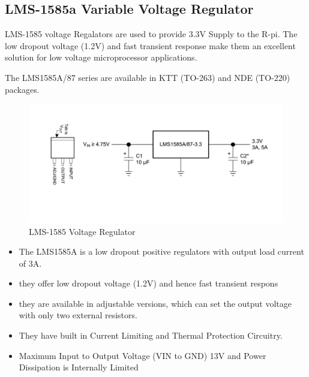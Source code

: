 \documentclass[11pt,a4paper]{article}
\begin{document}
	\subsection{LMS-1585a Variable Voltage Regulator} 
	LMS-1585 voltage Regalators are used to provide 3.3V Supply to the R-pi. The low dropout voltage (1.2V) and
	fast transient response make them an excellent solution for low voltage microprocessor applications.
	
	 The LMS1585A/87 series are available in KTT (TO-263) and NDE (TO-220) packages.
	 \begin{figure}[h!]
	 	\includegraphics[scale=0.49]{1585.jpg}
	 				\caption{LMS-1585 Voltage Regulator}
	 \end{figure}
	
	\begin{itemize}
		\item The LMS1585A is a low dropout positive regulators with output load current of 3A.
		\item they offer low dropout voltage (1.2V) and hence fast transient respons
		\item they are available in adjustable versions, which can set the output voltage with only two external resistors.
		\item They have built in Current Limiting and Thermal Protection Circuitry. 
		\item Maximum Input to Output Voltage (VIN to GND) 13V and Power Dissipation is Internally Limited
	\end{itemize}
	
	
\end{document}
